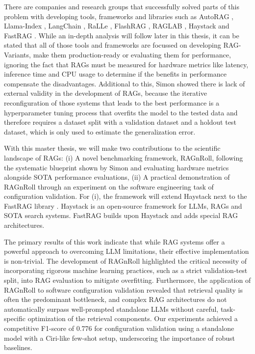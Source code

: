 There are companies and research groups that successfully solved parts of this problem with developing tools, frameworks and libraries such as AutoRAG \cite{AutoRAG}, Llama-Index \cite{Liu_LlamaIndex_2022}, LangChain \cite{Chase_LangChain_2022}, RaLLe \cite{ralle}, FlashRAG \cite{FlashRAG}, RAGLAB \cite{zhang-etal-2024-raglab}, Haystack \cite{Pietsch_Haystack_the_end-to-end_2019} and FastRAG \cite{Izsak_fastRAG_Efficient_Retrieval_2023}. While an in-depth analysis will follow later in this thesis, it can be stated that all of those tools and frameworks are focussed on developing RAG-Variants, make them production-ready or evaluating them for performance, ignoring the fact that RAGs must be measured for hardware metrics like latency, inference time and CPU usage to determine if the benefits in performance compensate the disadvantages. Additional to this, Simon \cite{Simon.10112024} showed there is lack of external validity in the development of RAGs, because the iterative reconfiguration of those systems that leads to the best performance is a hyperparameter tuning process that overfits the model to the tested data and therefore requires a dataset split with a validation dataset and a holdout test dataset, which is only used to estimate the generalization error.

With this master thesis, we will make two contributions to the scientific landscape of RAGs: (i) A novel benchmarking framework, RAGnRoll, following the systematic blueprint shown by Simon \cite{Simon.10112024} and evaluating hardware metrics alongside SOTA performance evaluations, (ii) A practical demonstration of RAGnRoll through an experiment on the software engineering task of configuration validation. For (i), the framework will extend Haystack \cite{Pietsch_Haystack_the_end-to-end_2019} next to the FastRAG library \cite{Izsak_fastRAG_Efficient_Retrieval_2023}. Haystack is an open-source framework for LLMs, RAGs and SOTA search systems. FastRAG builds upon Haystack and adds special RAG architectures. 

The primary results of this work indicate that while RAG systems offer a powerful approach to overcoming LLM limitations, their effective implementation is non-trivial. The development of RAGnRoll highlighted the critical necessity of incorporating rigorous machine learning practices, such as a strict validation-test split, into RAG evaluation to mitigate overfitting. Furthermore, the application of RAGnRoll to software configuration validation revealed that retrieval quality is often the predominant bottleneck, and complex RAG architectures do not automatically surpass well-prompted standalone LLMs without careful, task-specific optimization of the retrieval components. Our experiments achieved a competitive F1-score of 0.776 for configuration validation using a standalone model with a Ciri-like few-shot setup, underscoring the importance of robust baselines.

